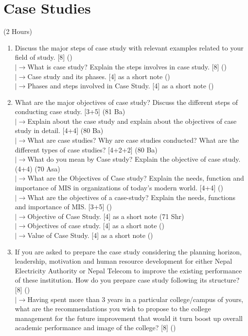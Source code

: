\documentclass[12pt]{article}
\newcommand{\lb}{\\$\left|\rightarrow\right.$}
\begin{document}
\pagebreak
\section{Case Studies}
\begin{center}(2 Hours)\end{center}
    \begin{enumerate}[topsep=0pt, noitemsep]
      \item Discuss the major steps of case study with relevant examples related to your field of study. \hfill [8] ()
        \lb What is case study? Explain the steps involves in case study. \hfill [8] ()
        \lb Case study and its phases. \hfill [4] as a short note ()
        \lb Phases and steps involved in Case Study. \hfill [4] as a short note ()

      \item What are the major objectives of case study? Discuss the different steps of conducting case study. \hfill [3+5] (81 Ba)
        \lb Explain about the case study and explain about the objectives of case study in detail. \hfill [4+4] (80 Ba)
        \lb What are case studies? Why are case studies conducted? What are the different types of case studies? \hfill [4+2+2] (80 Ba)
        \lb What do you mean by Case study? Explain the objective of case study. \hfill (4+4) (70 Asa)
        \lb What are the Objectives of Case study? Explain the needs, function and importance of MIS in organizations of today's modern world. \hfill [4+4] ()
        \lb What are the objectives of a case-study? Explain the needs, functions and importance of MIS. \hfill [3+5] ()
        \lb Objective of Case Study. \hfill [4] as a short note (71 Shr)
        \lb Objectives of case study. \hfill [4] as a short note ()
        \lb Value of Case Study. \hfill [4] as a short note ()

      \item If you are asked to prepare the case study considering the planning horizon, leadership, motivation and human resource development for either Nepal Electricity Authority or Nepal Telecom to improve the existing performance of these institution. How do you prepare case study following its structure? \hfill [8] ()
        \lb Having spent more than 3 years in a particular college/campus of yours, what are the recommendations you wish to propose to the college management for the future improvement that would it turn boost up overall academic performance and image of the college? \hfill [8] ()
    \end{enumerate}
\end{document}
